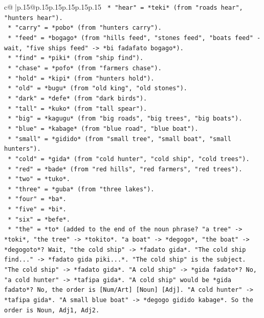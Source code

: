 \documentclass{article}
\begin{document}
{\begin{supertabular}{c@{$\;$}|p{.15\linewidth}@{}p{.15\linewidth}p{.15\linewidth}p{.15\linewidth}p{.15\linewidth}p{.15\linewidth}}
{{{\texttt{        *   "hear" = *teki* (from "roads hear", "hunters hear").} \\
\texttt{        *   "carry" = *pobo* (from "hunters carry").} \\
\texttt{        *   "feed" = *bogago* (from "hills feed", "stones feed", "boats feed" {-} wait, "five ships feed" {-}> *bi fadafato bogago*).} \\
\texttt{        *   "find" = *piki* (from "ship find").} \\
\texttt{        *   "chase" = *pofo* (from "farmers chase").} \\
\texttt{        *   "hold" = *kipi* (from "hunters hold").} \\
\texttt{        *   "old" = *bugu* (from "old king", "old stones").} \\
\texttt{        *   "dark" = *defe* (from "dark birds").} \\
\texttt{        *   "tall" = *kuko* (from "tall spear").} \\
\texttt{        *   "big" = *kagugu* (from "big roads", "big trees", "big boats").} \\
\texttt{        *   "blue" = *kabage* (from "blue road", "blue boat").} \\
\texttt{        *   "small" = *gidido* (from "small tree", "small boat", "small hunters").} \\
\texttt{        *   "cold" = *gida* (from "cold hunter", "cold ship", "cold trees").} \\
\texttt{        *   "red" = *bade* (from "red hills", "red farmers", "red trees").} \\
\texttt{        *   "two" = *tuko*.} \\
\texttt{        *   "three" = *guba* (from "three lakes").} \\
\texttt{        *   "four" = *ba*.} \\
\texttt{        *   "five" = *bi*.} \\
\texttt{        *   "six" = *befe*.} \\
\texttt{        *   "the" = *to* (added to the end of the noun phrase? "a tree" {-}> *toki*, "the tree" {-}> *tokito*. "a boat" {-}> *degogo*, "the boat" {-}> *degogoto*? Wait, "the cold ship" {-}> *fadato gida*. "The cold ship find..." {-}> *fadato gida piki...*. "The cold ship" is the subject. "The cold ship" {-}> *fadato gida*. "A cold ship" {-}> *gida fadato*? No, "a cold hunter" {-}> *tafipa gida*. "A cold ship" would be *gida fadato*? No, the order is {[}Num/Art{]} {[}Noun{]} {[}Adj{]}. "A cold hunter" {-}> *tafipa gida*. "A small blue boat" {-}> *degogo gidido kabage*. So the order is Noun, Adj1, Adj2.} \\
}}}
\end{supertabular}}
\end{document}
